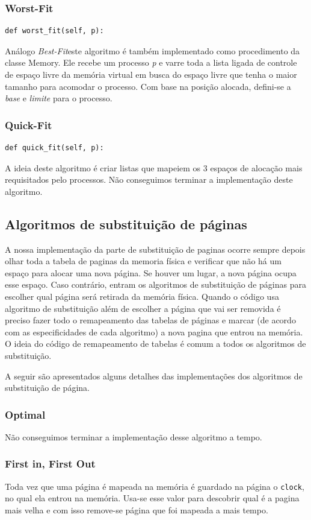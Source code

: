 \documentclass[12pt,a4paper]{article}
\begin{document}
\subsubsection{Worst-Fit}	
\begin{lstlisting}
def worst_fit(self, p):
\end{lstlisting}
Análogo \textit{Best-Fit}este algoritmo é também implementado como procedimento da classe Memory. Ele recebe um processo \textit{p} e varre toda a lista ligada de controle de espaço livre da memória virtual em busca do espaço livre que tenha o maior tamanho para acomodar o processo. Com base na posição alocada, defini-se a \textit{base} e \textit{limite} para o processo.

\subsubsection{Quick-Fit}
\begin{lstlisting}
def quick_fit(self, p):
\end{lstlisting}
A ideia deste algoritmo é criar listas que mapeiem os 3 espaços de alocação mais requisitados pelo processos. Não conseguimos terminar a implementação deste algoritmo.


\subsection{Algoritmos de substituição de páginas}
A nossa implementação da parte de substituição de paginas ocorre sempre depois olhar toda a tabela de paginas da memoria física e verificar que não há um espaço para alocar uma nova página. Se houver um lugar, a nova página ocupa esse espaço. Caso contrário, entram os algoritmos de substituição de páginas para escolher qual página será retirada da memória física. Quando o código usa algoritmo de substituição além de escolher a página que vai ser removida é preciso fazer todo o remapeamento das tabelas de páginas e marcar (de acordo com as especificidades de cada algoritmo) a nova pagina que entrou na memória. O ideia do código de remapeamento de tabelas é comum a todos os algoritmos de substituição. 

A seguir são apresentados alguns detalhes das implementações dos algoritmos de substituição de página. 
\subsubsection{Optimal}
Não conseguimos terminar a implementação desse algoritmo a tempo.
\subsubsection{First in, First Out}
Toda vez que uma página é mapeada na memória é guardado na página o \texttt{clock}, no qual ela entrou na memória. Usa-se esse valor para descobrir qual é a pagina mais velha e com isso remove-se página que foi mapeada a mais tempo.
\end{document}
